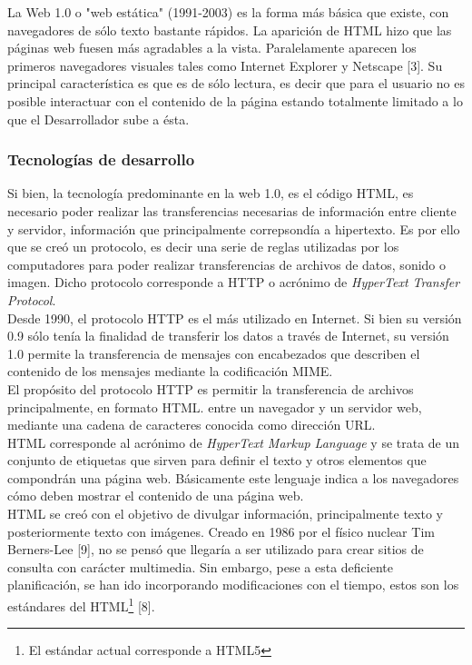 La Web 1.0 o "web estática" (1991-2003) es la forma más básica que existe, con navegadores 
de sólo texto bastante rápidos. La aparición de HTML hizo que las páginas web fuesen más 
agradables a la vista. Paralelamente aparecen los primeros navegadores visuales tales como 
Internet Explorer y Netscape [3]. Su principal característica es que es de sólo lectura, es 
decir que para el usuario no es posible interactuar con el contenido de la página estando 
totalmente limitado a lo que el Desarrollador sube a ésta.

\subsubsection{Tecnologías de desarrollo}

Si bien, la tecnología predominante en la web 1.0, es el código HTML, es necesario poder 
realizar las transferencias necesarias de información entre cliente y servidor, información que 
principalmente correpsondía a hipertexto. Es por ello que se creó un protocolo, es decir una serie 
de reglas utilizadas por los computadores para poder realizar transferencias de archivos de datos,
sonido o imagen. Dicho protocolo corresponde a HTTP o acrónimo de \textit{HyperText Transfer Protocol}.\\

Desde 1990, el protocolo HTTP  es el más utilizado en Internet. Si bien su versión 0.9 sólo tenía 
la finalidad de transferir los datos a través de Internet, su versión 1.0 permite la transferencia de 
mensajes con encabezados que describen el contenido de los mensajes mediante la codificación MIME.\\

El propósito del protocolo HTTP es permitir la transferencia de archivos principalmente, en formato 
HTML. entre un navegador y un servidor web,  mediante una cadena de caracteres conocida como dirección 
URL.\\ 

HTML corresponde al acrónimo de \textit{HyperText Markup Language} y se trata de un conjunto de 
etiquetas que sirven para definir el texto y otros elementos que compondrán una página web. Básicamente 
este lenguaje indica a los navegadores cómo deben mostrar el contenido de una página web.\\

HTML se creó con el objetivo de divulgar información, principalmente texto y posteriormente texto 
con imágenes. Creado en 1986 por el físico nuclear Tim Berners-Lee [9], no se pensó que llegaría  a 
ser utilizado para crear sitios de consulta con carácter multimedia. Sin embargo, pese a esta deficiente 
planificación, se han ido incorporando modificaciones con el tiempo, estos son los estándares del 
HTML\footnote{El estándar actual corresponde a HTML5} [8].\\

